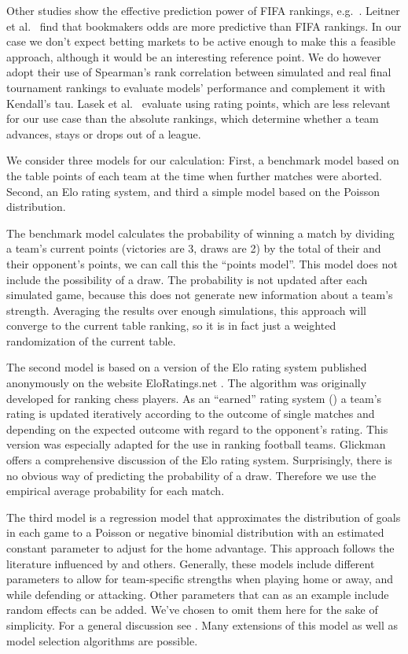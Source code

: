 \documentclass[12pt,a4paper]{article}
\begin{document}
Other studies show the effective prediction power of FIFA rankings,
e.g.~\textcite{suzuki2008}. Leitner et al.~\autocite*{leitner2010} find
that bookmakers odds are more predictive than FIFA rankings. In our case
we don't expect betting markets to be active enough to make this a
feasible approach, although it would be an interesting reference point.
We do however adopt their use of Spearman's rank correlation between
simulated and real final tournament rankings to evaluate models'
performance and complement it with Kendall's tau. Lasek et
al.~\autocite*{lasek2013} evaluate using rating points, which are less
relevant for our use case than the absolute rankings, which determine
whether a team advances, stays or drops out of a league.

We consider three models for our calculation: First, a benchmark model
based on the table points of each team at the time when further matches
were aborted. Second, an Elo rating system, and third a simple model
based on the Poisson distribution.

The benchmark model calculates the probability of winning a match by
dividing a team's current points (victories are 3, draws are 2) by the
total of their and their opponent's points, we can call this the
\enquote{points model}. This model does not include the possibility of a
draw. The probability is not updated after each simulated game, because
this does not generate new information about a team's strength.
Averaging the results over enough simulations, this approach will
converge to the current table ranking, so it is in fact just a weighted
randomization of the current table.

The second model is based on a version of the Elo rating system
published anonymously on the website EloRatings.net
\autocite*{eloratings}. The algorithm was originally developed for
ranking chess players. As an \enquote{earned} rating system
(\textcite{lasek2013}) a team's rating is updated iteratively according
to the outcome of single matches and depending on the expected outcome
with regard to the opponent's rating. This version was especially
adapted for the use in ranking football teams. Glickman
\autocite*{glickman1995} offers a comprehensive discussion of the Elo
rating system. Surprisingly, there is no obvious way of predicting the
probability of a draw. Therefore we use the empirical average
probability for each match.

The third model is a regression model that approximates the distribution
of goals in each game to a Poisson or negative binomial distribution
with an estimated constant parameter to adjust for the home advantage.
This approach follows the literature influenced by \textcite{maher1982}
and others. Generally, these models include different parameters to
allow for team-specific strengths when playing home or away, and while
defending or attacking. Other parameters that can as an example include
random effects can be added. We've chosen to omit them here for the sake
of simplicity. For a general discussion see \textcite{karlis2003}. Many
extensions of this model as well as model selection algorithms are
possible.
\end{document}
